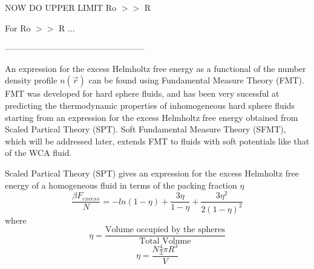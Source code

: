 \documentclass[12pt]{article}
\begin{document}
NOW DO UPPER LIMIT  Ro $>>$ R

For Ro $>>$ R ...

--------------------------------------------------

An expression for the excess Helmholtz free energy as a functional of the number density profile $n(\vec r)$ can be found using Fundamental Measure Theory (FMT).
FMT was developed for hard sphere fluids, and has been very sucessful at predicting the thermodynamic properties of 
inhomogeneous hard sphere fluids starting from an expression for the excess Helmholtz free energy obtained from Scaled Partical Theory (SPT). 
Soft Fundamental Measure Theory (SFMT), which will be addressed later, extends FMT to fluids with soft potentials like that of the WCA fluid.

Scaled Partical Theory (SPT) gives an expression for the excess Helmholtz free energy of a homogeneous fluid in terms of the packing fraction $\eta$ 
\begin{equation}\label{SPT_FE}{\frac{\beta{F_{excess}}}{N}=-ln(1-\eta)+\frac{3\eta}{1-\eta}+\frac{3{\eta}^2}{2(1-\eta)^2}}\end{equation} 
where
\begin{equation}{\eta = \frac{\mbox{Volume occupied by the spheres}}{\mbox{Total Volume}}}\end{equation}
\begin{equation}{\eta = \frac{N\frac{4}{3}\pi{R^3}}{V}}\end{equation}
\end{document}
